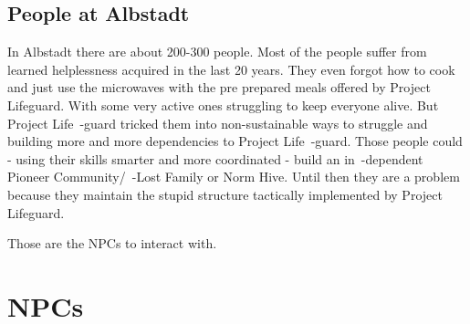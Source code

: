 \subsection{People at Albstadt}

In Albstadt there are about 200-300 people. Most of the people suffer from learned helplessness acquired in the last 20 years. They even forgot how to cook and just use the microwaves with the pre prepared meals offered by Project Lifeguard. With some very active ones struggling to keep everyone alive. But Project Life~-guard tricked them into non-sustainable ways to struggle and building more and more dependencies to Project Life~-guard. Those people could - using their skills smarter and more coordinated - build an in~-dependent Pioneer Community/~-Lost Family or Norm Hive. Until then they are a problem because they maintain the stupid structure tactically implemented by Project Lifeguard.

Those are the NPCs to interact with.

\section{NPCs}

\newpage

